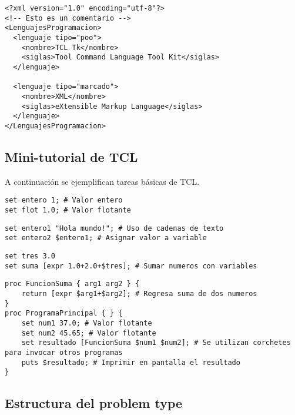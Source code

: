 \documentclass[10pt, a4paper, twocolumn]{article}
\begin{document}
\lstset{language=XML} 
\begin{lstlisting}[caption={Ejemplo de una clasificación de lenguajes en XML.}]
<?xml version="1.0" encoding="utf-8"?>
<!-- Esto es un comentario -->
<LenguajesProgramacion>
  <lenguaje tipo="poo">
    <nombre>TCL Tk</nombre> 
    <siglas>Tool Command Language Tool Kit</siglas>   
  </lenguaje>
  
  <lenguaje tipo="marcado">
    <nombre>XML</nombre>
    <siglas>eXtensible Markup Language</siglas>
  </lenguaje>
</LenguajesProgramacion>
\end{lstlisting}

\subsection{Mini-tutorial de TCL}

A continuación se ejemplifican tareas básicas de TCL.

\lstset{language=tcl} 

\begin{lstlisting}[caption={Asignar valor a una variable.}]
set entero 1; # Valor entero
set flot 1.0; # Valor flotante 
\end{lstlisting}

\begin{lstlisting}[caption={Asignar valor de una variable a otra.}]
set entero1 "Hola mundo!"; # Uso de cadenas de texto
set entero2 $entero1; # Asignar valor a variable
\end{lstlisting}

\begin{lstlisting}[caption={Operaciones matemáticas.}]
set tres 3.0
set suma [expr 1.0+2.0+$tres]; # Sumar numeros con variables
\end{lstlisting}

\begin{lstlisting}[caption={Crear funciones o procedimientos (\textbf{\texttt{proc}}).}]
proc FuncionSuma { arg1 arg2 } {
	return [expr $arg1+$arg2]; # Regresa suma de dos numeros
}
proc ProgramaPrincipal { } {
	set num1 37.0; # Valor flotante 
	set num2 45.65; # Valor flotante 
	set resultado [FuncionSuma $num1 $num2]; # Se utilizan corchetes para invocar otros programas
	puts $resultado; # Imprimir en pantalla el resultado
}
\end{lstlisting}

\subsection{Estructura del problem type}
\end{document}
